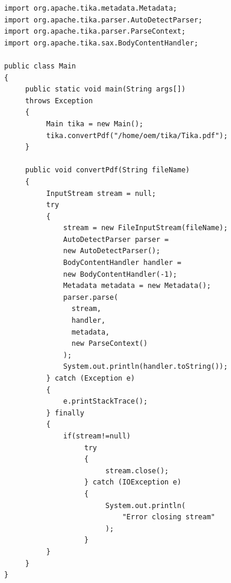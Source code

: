 \documentclass{article}
\begin{document}
\begin{enumerate}
\begin{lstlisting}[frame=single]
import org.apache.tika.metadata.Metadata;
import org.apache.tika.parser.AutoDetectParser;
import org.apache.tika.parser.ParseContext;
import org.apache.tika.sax.BodyContentHandler;

public class Main
{
     public static void main(String args[])
     throws Exception
     {
          Main tika = new Main();
          tika.convertPdf("/home/oem/tika/Tika.pdf");
     }
     
     public void convertPdf(String fileName)
     {
          InputStream stream = null;
          try
          {
              stream = new FileInputStream(fileName);
              AutoDetectParser parser =
              new AutoDetectParser();
              BodyContentHandler handler =
              new BodyContentHandler(-1);
              Metadata metadata = new Metadata();
              parser.parse(
                stream,
                handler,
                metadata,
                new ParseContext()
              );
              System.out.println(handler.toString());
          } catch (Exception e)
          {
              e.printStackTrace();
          } finally
          {
              if(stream!=null)
                   try
                   {
                        stream.close();
                   } catch (IOException e)
                   {
                        System.out.println(
                            "Error closing stream"
                        );
                   }
          }
     }
}
        \end{lstlisting}
\end{enumerate}
\end{document}
